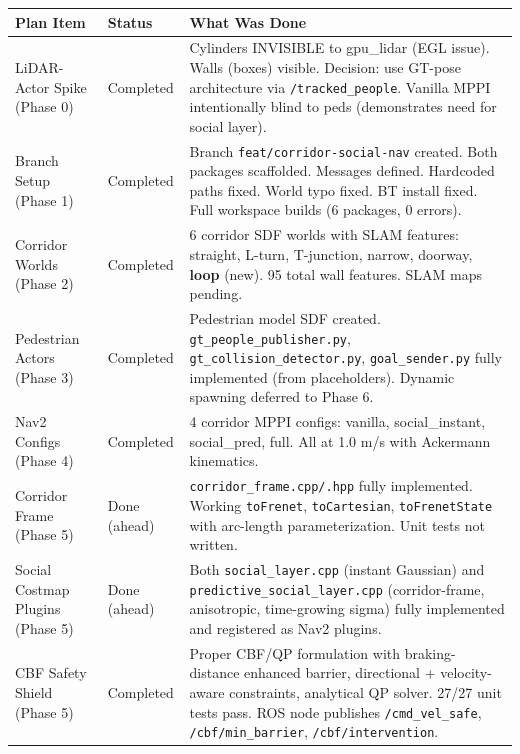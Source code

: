 \documentclass[11pt]{article}
\begin{document}
\begin{center}
\small
\begin{tabular}{|l|l|p{7.5cm}|}
\hline
\textbf{Plan Item} & \textbf{Status} & \textbf{What Was Done} \\
\hline
LiDAR-Actor Spike (Phase 0) & \textcolor{fixgreen}{Completed} & Cylinders INVISIBLE to gpu\_lidar (EGL issue). Walls (boxes) visible. Decision: use GT-pose architecture via \texttt{/tracked\_people}. Vanilla MPPI intentionally blind to peds (demonstrates need for social layer). \\
\hline
Branch Setup (Phase 1) & \textcolor{fixgreen}{Completed} & Branch \texttt{feat/corridor-social-nav} created. Both packages scaffolded. Messages defined. Hardcoded paths fixed. World typo fixed. BT install fixed. Full workspace builds (6 packages, 0 errors). \\
\hline
Corridor Worlds (Phase 2) & \textcolor{fixgreen}{Completed} & 6 corridor SDF worlds with SLAM features: straight, L-turn, T-junction, narrow, doorway, \textbf{loop} (new). 95 total wall features. SLAM maps pending. \\
\hline
Pedestrian Actors (Phase 3) & \textcolor{fixgreen}{Completed} & Pedestrian model SDF created. \texttt{gt\_people\_publisher.py}, \texttt{gt\_collision\_detector.py}, \texttt{goal\_sender.py} fully implemented (from placeholders). Dynamic spawning deferred to Phase 6. \\
\hline
Nav2 Configs (Phase 4) & \textcolor{fixgreen}{Completed} & 4 corridor MPPI configs: vanilla, social\_instant, social\_pred, full. All at 1.0 m/s with Ackermann kinematics. \\
\hline
Corridor Frame (Phase 5) & \textcolor{fixgreen}{Done (ahead)} & \texttt{corridor\_frame.cpp/.hpp} fully implemented. Working \texttt{toFrenet}, \texttt{toCartesian}, \texttt{toFrenetState} with arc-length parameterization. Unit tests not written. \\
\hline
Social Costmap Plugins (Phase 5) & \textcolor{fixgreen}{Done (ahead)} & Both \texttt{social\_layer.cpp} (instant Gaussian) and \texttt{predictive\_social\_layer.cpp} (corridor-frame, anisotropic, time-growing sigma) fully implemented and registered as Nav2 plugins. \\
\hline
CBF Safety Shield (Phase 5) & \textcolor{fixgreen}{Completed} & Proper CBF/QP formulation with braking-distance enhanced barrier, directional + velocity-aware constraints, analytical QP solver. 27/27 unit tests pass. ROS node publishes \texttt{/cmd\_vel\_safe}, \texttt{/cbf/min\_barrier}, \texttt{/cbf/intervention}. \\

\end{tabular}
\end{center}
\end{document}
